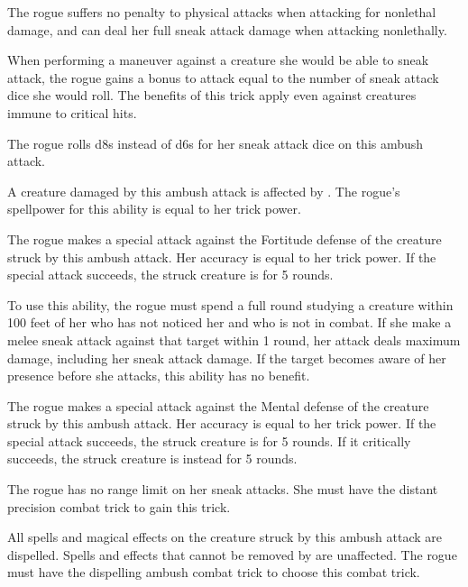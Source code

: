The rogue suffers no penalty to physical attacks when attacking for nonlethal damage, and can deal her full sneak attack damage when attacking nonlethally.


When performing a maneuver against a creature she would be able to sneak attack, the rogue gains a bonus to attack equal to the number of sneak attack dice she would roll.
The benefits of this trick apply even against creatures immune to critical hits.

The rogue rolls d8s instead of d6s for her sneak attack dice on this ambush attack.

A creature damaged by this ambush attack is affected by .
The rogue's spellpower for this ability is equal to her trick power.

The rogue makes a special attack against the Fortitude defense of the creature struck by this ambush attack.
Her accuracy is equal to her trick power.
If the special attack succeeds, the struck creature is \staggered for 5 rounds.

To use this ability, the rogue must spend a full round studying a creature within 100 feet of her who has not noticed her and who is not in combat.
If she make a melee sneak attack against that target within 1 round, her attack deals maximum damage, including her sneak attack damage.
If the target becomes aware of her presence before she attacks, this ability has no benefit.

The rogue makes a special attack against the Mental defense of the creature struck by this ambush attack.
Her accuracy is equal to her trick power.
If the special attack succeeds, the struck creature is \disoriented for 5 rounds.
If it critically succeeds, the struck creature is instead \confused for 5 rounds.

The rogue has no range limit on her sneak attacks.
She must have the distant precision combat trick to gain this trick.

All spells and magical effects on the creature struck by this ambush attack are dispelled.
Spells and effects that cannot be removed by  are unaffected.
The rogue must have the dispelling ambush combat trick to choose this combat trick.


